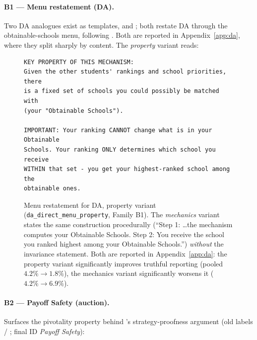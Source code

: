 \paragraph{B1 --- Menu restatement (DA).} Two DA analogues exist as templates,  and ; both restate DA through the obtainable-schools menu, following \citet{gonczarowski2023strategyproofness}. Both are reported in Appendix~\ref{app:da}, where they split sharply by content. The \emph{property} variant reads:

\begin{figure}[H]
\begin{lstlisting}
KEY PROPERTY OF THIS MECHANISM:
Given the other students' rankings and school priorities, there
is a fixed set of schools you could possibly be matched with
(your "Obtainable Schools").

IMPORTANT: Your ranking CANNOT change what is in your Obtainable
Schools. Your ranking ONLY determines which school you receive
WITHIN that set - you get your highest-ranked school among the
obtainable ones.
\end{lstlisting}
\caption{Menu restatement for DA, property variant (\texttt{da\_direct\_menu\_property}, Family B1). The \emph{mechanics} variant states the same construction procedurally (``Step 1: \ldots the mechanism computes your Obtainable Schools. Step 2: You receive the school you ranked highest among your Obtainable Schools.'') \emph{without} the invariance statement. Both are reported in Appendix~\ref{app:da}: the property variant significantly improves truthful reporting (pooled $4.2\% \to 1.8\%$), the mechanics variant significantly worsens it ($4.2\% \to 6.9\%$).}
\label{fig:prompt-da-menu}
\end{figure}

\paragraph{B2 --- Payoff Safety (auction).} Surfaces the pivotality property behind \citet{vickrey1961counterspeculation}'s strategy-proofness argument (old labels  / ; final ID \emph{Payoff Safety}):

